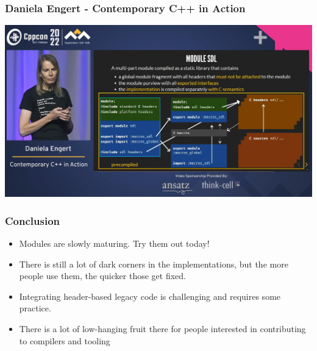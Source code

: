 \documentclass[aspectratio=169]{beamer}
\begin{document}
\begin{frame}
  \frametitle{Daniela Engert - Contemporary C++ in Action}
  \begin{center}
    \href{https://www.youtube.com/watch?v=yUIFdL3D0Vk}
    {\includegraphics[height=.8\textheight]{modulesgfx/engert_contemporary.jpg}}
  \end{center}
\end{frame}


\begin{frame}
  \frametitle{Conclusion}

  \begin{itemize}
  \item Modules are slowly maturing. Try them out today!
  \item There is still a lot of dark corners in the implementations, but the more people use them, the quicker those get fixed.
  \item Integrating header-based legacy code is challenging and requires some
  practice.
  \item \alert<2>{There is a lot of low-hanging fruit there for people interested in contributing to compilers and tooling}
  \end{itemize}

\end{frame}

\end{document}
